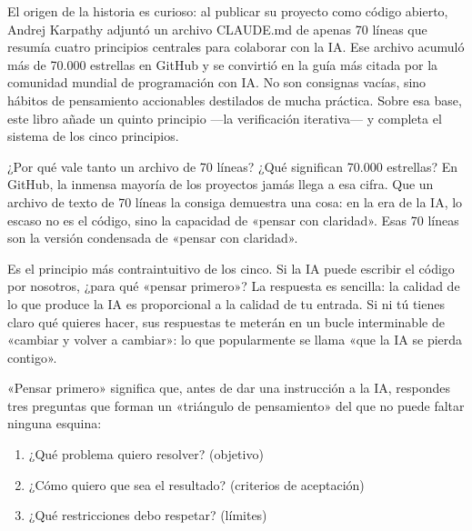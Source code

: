 

El origen de la historia es curioso: al publicar su proyecto como código abierto, Andrej Karpathy adjuntó un archivo CLAUDE.md de apenas 70 líneas que resumía cuatro principios centrales para colaborar con la IA. Ese archivo acumuló más de 70.000 estrellas en GitHub y se convirtió en la guía más citada por la comunidad mundial de programación con IA. No son consignas vacías, sino hábitos de pensamiento accionables destilados de mucha práctica. Sobre esa base, este libro añade un quinto principio —la verificación iterativa— y completa el sistema de los cinco principios.

\begin{tcbinfo}{¿Por qué vale tanto un archivo de 70 líneas?}
¿Qué significan 70.000 estrellas? En GitHub, la inmensa mayoría de los proyectos jamás llega a esa cifra. Que un archivo de texto de 70 líneas la consiga demuestra una cosa: en la era de la IA, lo escaso no es el código, sino la capacidad de «pensar con claridad». Esas 70 líneas son la versión condensada de «pensar con claridad».

\end{tcbinfo}


Es el principio más contraintuitivo de los cinco. Si la IA puede escribir el código por nosotros, ¿para qué «pensar primero»? La respuesta es sencilla: la calidad de lo que produce la IA es proporcional a la calidad de tu entrada. Si ni tú tienes claro qué quieres hacer, sus respuestas te meterán en un bucle interminable de «cambiar y volver a cambiar»: lo que popularmente se llama «que la IA se pierda contigo».

«Pensar primero» significa que, antes de dar una instrucción a la IA, respondes tres preguntas que forman un «triángulo de pensamiento» del que no puede faltar ninguna esquina:

\begin{enumerate}
  \item ¿Qué problema quiero resolver? (objetivo)
  \item ¿Cómo quiero que sea el resultado? (criterios de aceptación)
  \item ¿Qué restricciones debo respetar? (límites)
\end{enumerate}

